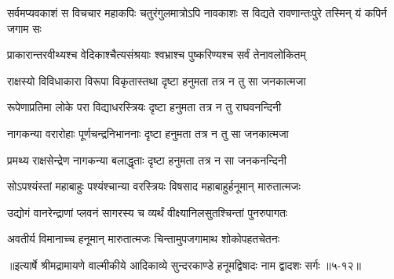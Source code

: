 \threelineshloka
{सर्वमप्यवकाशं स विचचार महाकपिः}
{चतुरंगुलमात्रोऽपि नावकाशः स विद्यते}
{रावणान्तःपुरे तस्मिन् यं कपिर्न जगाम सः} %

\twolineshloka
{प्राकारान्तरवीथ्यश्च वेदिकाश्चैत्यसंश्रयाः}
{श्वभ्राश्च पुष्करिण्यश्च सर्वं तेनावलोकितम्} %

\twolineshloka
{राक्षस्यो विविधाकारा विरूपा विकृतास्तथा}
{दृष्टा हनुमता तत्र न तु सा जनकात्मजा} %

\twolineshloka
{रूपेणाप्रतिमा लोके परा विद्याधरस्त्रियः}
{दृष्टा हनुमता तत्र न तु राघवनन्दिनी} %

\twolineshloka
{नागकन्या वरारोहाः पूर्णचन्द्रनिभाननाः}
{दृष्टा हनुमता तत्र न तु सा जनकात्मजा} %

\twolineshloka
{प्रमथ्य राक्षसेन्द्रेण नागकन्या बलाद्धृताः}
{दृष्टा हनुमता तत्र न सा जनकनन्दिनी} %

\twolineshloka
{सोऽपश्यंस्तां महाबाहुः पश्यंश्चान्या वरस्त्रियः}
{विषसाद महाबाहुर्हनूमान् मारुतात्मजः} %

\twolineshloka
{उद्योगं वानरेन्द्राणां प्लवनं सागरस्य च}
{व्यर्थं वीक्ष्यानिलसुतश्चिन्तां पुनरुपागतः} %

\twolineshloka
{अवतीर्य विमानाच्च हनूमान् मारुतात्मजः}
{चिन्तामुपजगामाथ शोकोपहतचेतनः} %


॥इत्यार्षे श्रीमद्रामायणे वाल्मीकीये आदिकाव्ये सुन्दरकाण्डे हनूमद्विषादः नाम द्वादशः सर्गः ॥५-१२॥
